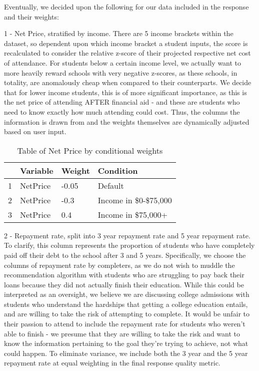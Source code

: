 \documentclass{article}\usepackage[]{graphicx}\usepackage[]{color}
\begin{document}
Eventually, we decided upon the following for our data included in the response and their weights:\newline



1 - Net Price, stratified by income. There are 5 income brackets within the dataset, so dependent upon which income bracket a student inputs, the score is recalculated to consider the relative z-score of their projected respective net cost of attendance. For students below a certain income level, we actually want to more heavily reward schools with very negative z-scores, as these schools, in totality, are anomalously cheap when compared to their counterparts. We decide that for lower income students, this is of more significant importance, as this is the net price of attending AFTER financial aid - and these are students who need to know exactly how much attending could cost. Thus, the columns the information is drawn from and the weights themselves are dynamically adjusted based on user input.

\begin{table}[ht]
\centering
\begin{tabular}{rlll}
  \hline
 & Variable & Weight & Condition \\ 
  \hline
1 & NetPrice & -0.05 & Default \\ 
  2 & NetPrice & -0.3 & Income in \$0-\$75,000 \\ 
  3 & NetPrice & 0.4 & Income in \$75,000+ \\ 
   \hline
\end{tabular}
\caption{Table of Net Price by conditional weights} 
\end{table}


2 - Repayment rate, split into 3 year repayment rate and 5 year repayment rate. To clarify, this column represents the proportion of students who have completely paid off their debt to the school after 3 and 5 years.  Specifically, we choose the columns of repayment rate by completers, as we do not wish to muddle the recommendation algorithm with students who are struggling to pay back their loans because they did not actually finish their education. While this could be interpreted as an oversight, we believe we are discussing college admissions with students who understand the hardships that getting a college education entails, and are willing to take the risk of attempting to complete. It would be unfair to their passion to attend to include the repayment rate for students who weren't able to finish - we presume that they are willing to take the risk and want to know the information pertaining to the goal they're trying to achieve, not what could happen. To eliminate variance, we include both the 3 year and the 5 year repayment rate at equal weighting in the final response quality metric.
\end{document}
